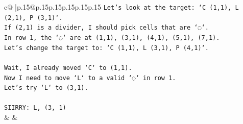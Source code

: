 \documentclass{article}
\begin{document}
{\begin{supertabular}{c@{$\;$}|p{.15\linewidth}@{}p{.15\linewidth}p{.15\linewidth}p{.15\linewidth}p{.15\linewidth}p{.15\linewidth}}
{{{\texttt{Let's look at the target: `C (1,1), L (2,1), P (3,1)`.} \\
\texttt{If (2,1) is a divider, I should pick cells that are `◌`.} \\
\texttt{In row 1, the `◌` are at (1,1), (3,1), (4,1), (5,1), (7,1).} \\
\texttt{Let's change the target to: `C (1,1), L (3,1), P (4,1)`.} \\
\\ 
\texttt{Wait, I already moved `C` to (1,1).} \\
\texttt{Now I need to move `L` to a valid `◌` in row 1.} \\
\texttt{Let's try `L` to (3,1).} \\
\\ 
\texttt{SIIRRY: L, (3, 1)} \\
            }
        }
    }
    & & \\ \\


\end{supertabular}}
\end{document}
